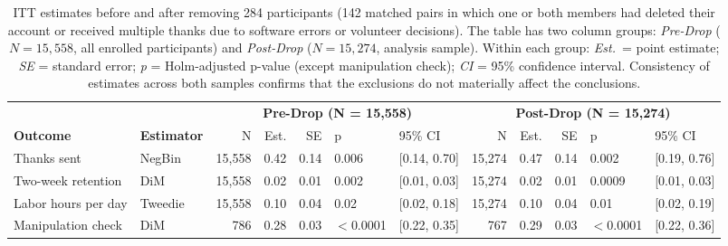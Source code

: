 \documentclass[9pt,twoside,lineno]{pnas-new}
\begin{document}
\clearpage
\begin{table}[ht]
\centering
\small
\caption{ITT estimates before and after removing 284 participants (142 matched pairs in which one or both members had deleted their account or received multiple thanks due to software errors or volunteer decisions). The table has two column groups: \textit{Pre-Drop} ($N = 15{,}558$, all enrolled participants) and \textit{Post-Drop} ($N = 15{,}274$, analysis sample). Within each group: \textit{Est.}\ = point estimate; \textit{SE} = standard error; \textit{p} = Holm-adjusted p-value (except manipulation check); \textit{CI} = 95\% confidence interval. Consistency of estimates across both samples confirms that the exclusions do not materially affect the conclusions.}
\label{table:predrop_results}
\begin{tabular}{llrrrllrrrll}
\toprule
 & & \multicolumn{5}{c}{\textbf{Pre-Drop (N = 15,558)}} & \multicolumn{5}{c}{\textbf{Post-Drop (N = 15,274)}} \\
\cmidrule(lr){3-7} \cmidrule(lr){8-12}
\textbf{Outcome} & \textbf{Estimator} & N & Est. & SE & p & 95\% CI & N & Est. & SE & p & 95\% CI \\
\midrule
Thanks sent & NegBin & 15,558 & 0.42 & 0.14 & 0.006 & [0.14, 0.70] & 15,274 & 0.47 & 0.14 & 0.002 & [0.19, 0.76] \\
Two-week retention & DiM & 15,558 & 0.02 & 0.01 & 0.002 & [0.01, 0.03] & 15,274 & 0.02 & 0.01 & 0.0009 & [0.01, 0.03] \\
Labor hours per day & Tweedie & 15,558 & 0.10 & 0.04 & 0.02 & [0.02, 0.18] & 15,274 & 0.10 & 0.04 & 0.01 & [0.02, 0.19] \\
\addlinespace
Manipulation check & DiM & 786 & 0.28 & 0.03 & $<$0.0001 & [0.22, 0.35] & 767 & 0.29 & 0.03 & $<$0.0001 & [0.22, 0.36] \\
\bottomrule
\end{tabular}
\end{table}
\end{document}
